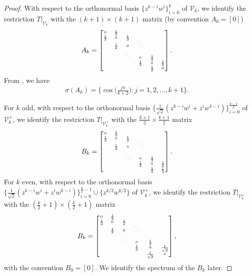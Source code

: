 \documentclass[10pt,reqno]{amsart}
\newcommand{\0}{{\color{lightgray}0}}
\newcommand{\V}{\mathcal{V}}
\theoremstyle{definition}
\numberwithin{equation}{section}
\begin{document}
\begin{proof}
With respect to the orthonormal basis $\{z^{k-i} w^i\}_{i=0}^k$ of $\V_k$, we identify 
the restriction $T|_{\V_k}$ with the $(k+1) \times (k+1)$ matrix (by convention $A_0 = [0]$)
\begin{equation*}
A_k =\tiny \begin{bmatrix}
0 & \frac{1}{2} &  &  &  & \\
\frac{1}{2} & 0 & \frac{1}{2} &  &  &\\[-5pt]
 & \frac{1}{2} & 0 & \ddots &  &\\
 &  & \ddots & 0 &  \frac{1}{2} &\\
 &  &  & \frac{1}{2} & 0 &\frac{1}{2}\\
  &  &  &  & \frac{1}{2} & 0
\end{bmatrix}.
\end{equation*}
From \cite[Prop.~2.1]{tridiageigen}, we have
\begin{equation}\label{eq:SpectrumAk}
\sigma (A_k) = \big\{ \cos \! \big( \tfrac{j \pi}{  k+2} \big) : j = 1,2, \ldots,k+1 \big\}.
\end{equation}



For $k$ odd, with respect to the orthonormal basis
$\{\frac{1}{\sqrt{2}}(z^{k-i} w^i+z^i w^{k-i})\}_{i=0}^{ \frac{k-1}{2}}$  of $\V_k^+$,
we identify the restriction $T|_{\V_k^+}$ with the $\frac{k+1}{2}\times \frac{k+1}{2}$ matrix
\begin{equation*}
B_k =\tiny \begin{bmatrix}
0 & \frac{1}{2} &  &  &  & \\
\frac{1}{2} & 0 & \frac{1}{2} &  &  &\\[-5pt]
 & \frac{1}{2} & 0 & \ddots &  &\\
 &  & \ddots & 0 &  \frac{1}{2} &\\
 &  &  & \frac{1}{2} & 0 & \frac{1}{2}\\[2pt]
  &  &  &  & \frac{1}{2} & \frac{1}{2}
\end{bmatrix}.
\end{equation*}
For $k$ even, with respect to the orthonormal basis
$\{\frac{1}{\sqrt{2}}(z^{k-i} w^i+z^i w^{k-i})\}_{i=0}^{ \frac{k}{2}-1}\cup \{z^{k/2}w^{k/2}\}$  of $\V_k^+$,
we identify the restriction $T|_{\V_k^+}$ with the $\left(\frac{k}{2}+1\right)\times \left(\frac{k}{2}+1\right)$ matrix
\begin{equation*}
B_k = \tiny\begin{bmatrix}
0 & \frac{1}{2} &  &  &  & \\
\frac{1}{2} & 0 & \frac{1}{2} &  &  &\\[-5pt]
 & \frac{1}{2} & 0 & \ddots &  &\\
 &  & \ddots & 0 &  \frac{1}{2} &\\
 &  &  & \frac{1}{2} & 0 & \frac{1}{\sqrt{2}}\\
  &  &  &  & \frac{1}{\sqrt{2}} & 0
\end{bmatrix} ,
\end{equation*}
with the convention $B_0 = [0]$.  We identify the spectrum of the $B_k$ later.


\end{proof}
\end{document}
